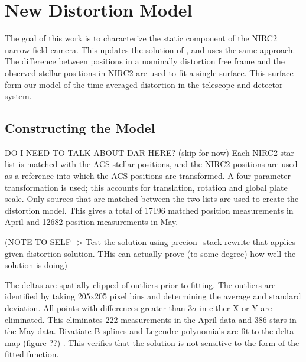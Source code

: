 \section{New Distortion Model}
The goal of this work is to characterize the static component of the NIRC2 narrow field camera.  This updates the solution of \cite{Yelda_2010}, and uses the same approach.  The difference between positions in a nominally distortion free frame and the observed stellar positions in NIRC2 are used to fit a single surface.  This surface form our model of the time-averaged distortion  in the telescope and detector system.

\subsection{Constructing the Model}
DO I NEED TO TALK ABOUT DAR HERE? (skip for now)
Each NIRC2 star list is matched with the ACS stellar positions, and the NIRC2 positions are used as a reference into which the ACS positions are transformed.  A four parameter transformation is used; this accounts for translation, rotation and global plate scale.  Only sources that are matched between the two lists are used to create the distortion model.  This gives a total of 17196 matched position measurements in April and 12682 position measurements in May.  

(NOTE TO SELF -> Test the solution using precion_stack rewrite that applies given distortion solution.  THis can actually prove (to some degree) how well the solution is doing)

The deltas are spatially clipped of outliers prior to fitting.  The outliers are identified by taking 205x205 pixel bins  and determining the average and standard deviation.  All points with differences greater than $3\sigma$ in either X or Y are eliminated.  This eliminates 222 measurements in the April data and 386 stars in the May data.
Bivatiate B-splines and Legendre polynomials are fit to the delta map (figure ??) .  This verifies that the solution is not sensitive to the form of the fitted function.
